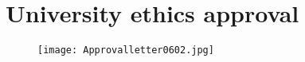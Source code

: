 
\chapter{University ethics approval}
\label{appendixd}

\begin{figure}[htbp]
\centerline{\texttt{[image: Approvalletter0602.jpg]}}
\label{ethicsform}
\end{figure}

